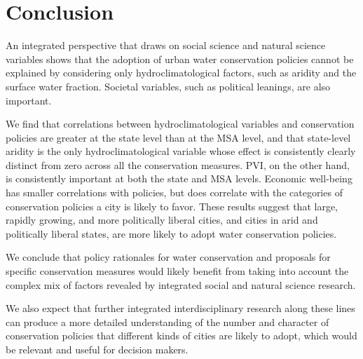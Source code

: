 \documentclass[draft,linenumbers]{agujournal}
\begin{document}
\section{Conclusion}
An integrated perspective that draws on social science and natural science
variables shows that the adoption of urban water conservation policies cannot be
explained by considering only hydroclimatological factors, such as aridity and
the surface water fraction. Societal variables, such as political leanings, are
also important.

We find that correlations between
hydroclimatological variables
and conservation policies are greater at the state level than at
the MSA level, and that state-level aridity is the only hydroclimatological
variable whose effect is consistently clearly distinct
from zero across all the conservation measures.
PVI, on the other hand, is consistently important at both the state and MSA
levels.
Economic well-being has smaller correlations with policies, but
does correlate with the
categories of conservation policies a city is likely to favor.
These results suggest that large, rapidly growing, and more politically liberal
cities, and cities in arid and politically liberal states,
are
more likely to
adopt water conservation policies.

We conclude that policy
rationales for water conservation and proposals for specific conservation measures
would likely benefit from taking into account the complex mix of factors revealed
by integrated social and natural science research.

We also expect that further integrated interdisciplinary research along
these lines can produce a more detailed understanding of the number and character
of conservation policies that different kinds of cities are likely to adopt,
which would be relevant and useful for decision makers.
\end{document}
